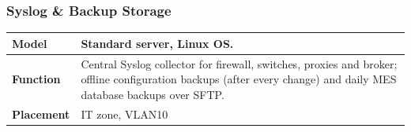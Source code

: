 \documentclass[11pt,a4paper]{article}
\renewcommand{\arraystretch}{1.15}
\begin{document}
\subsubsection{Syslog \& Backup Storage}
\renewcommand{\arraystretch}{1.3} %
\begin{tabularx}{\textwidth}{>{\bfseries}p{2.5cm} X}
    \toprule
    Model & Standard server, Linux OS. \\
    \midrule
    Function & Central Syslog collector for firewall, switches, proxies and
    broker; offline configuration backups (after every change) and daily MES
    database backups over SFTP.\\
    \midrule
    Placement & IT zone, VLAN10\\
    \midrule
\end{tabularx}

\pagebreak
\end{document}
